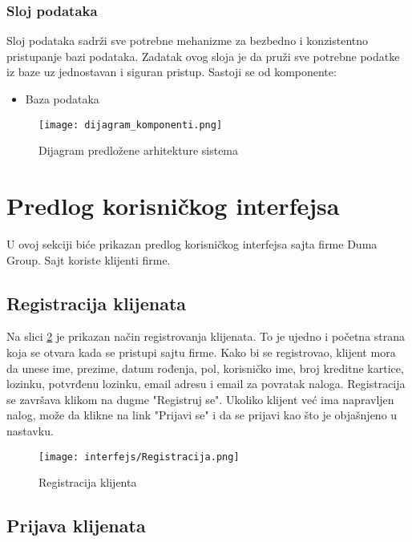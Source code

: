 \documentclass[a4paper]{article}
\begin{document}
\subsubsection{Sloj podataka}
Sloj podataka sadrži sve potrebne mehanizme za bezbedno i konzistentno pristupanje bazi podataka. Zadatak ovog sloja je da pruži sve potrebne podatke iz baze uz jednostavan i siguran  pristup.\newline
Sastoji se od komponente:
\begin{itemize}
    \item Baza podataka
\end{itemize}

\begin{figure}[H]
    \centering
    \texttt{[image: dijagram\_komponenti.png]}
    \caption{Dijagram predložene arhitekture sistema}
    \label{fig:dijagramTabela}
\end{figure}

\section{Predlog korisničkog interfejsa}

U ovoj sekciji biće prikazan predlog korisničkog interfejsa sajta firme Duma Group. Sajt koriste klijenti firme.

\subsection{Registracija klijenata}

Na slici \ref{fig:ki_reg} je prikazan način registrovanja klijenata. To je ujedno i početna strana koja se otvara kada se pristupi sajtu firme. Kako bi se registrovao, klijent mora da unese ime, prezime, datum rođenja, pol, korisničko ime, broj kreditne kartice, lozinku, potvrđenu lozinku, email adresu i email za povratak naloga. Registracija se završava klikom na dugme "Registruj se". Ukoliko klijent već ima napravljen nalog, može da klikne na link "Prijavi se" i da se prijavi kao što je objašnjeno u nastavku.

\begin{figure}[H]
    \centering
    \texttt{[image: interfejs/Registracija.png]}
    \caption{Registracija klijenta}
    \label{fig:ki_reg}
\end{figure}

\subsection{Prijava klijenata}
\end{document}

